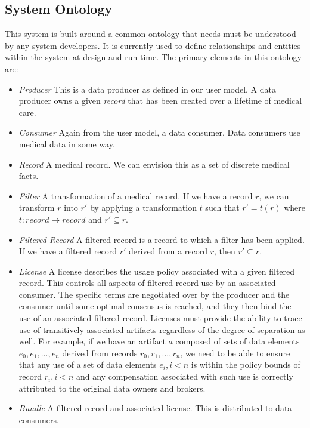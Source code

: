 \documentclass[10pt, conference, compsocconf]{IEEEtran}
\begin{document}
\subsection{System Ontology}
This system is built around a common ontology that needs must be understood by any system developers.  It is currently used to define relationships and entities within the system at design and run time.  The primary elements in this ontology are:
\begin{itemize}
\item \textit{Producer} This is a data producer as defined in our user model.  A data producer owns a given \textit{record} that has been created over a lifetime of medical care.
\item \textit{Consumer} Again from the user model, a data consumer.  Data consumers use medical data in some way.
\item \textit{Record} A medical record.  We can envision this as a set of discrete medical facts.
\item \textit{Filter} A transformation of a medical record.  If we have a record $ r $, we can transform $ r $ into $ r' $ by applying a transformation $ t $ such that $ r' = t(r) $ where $ t : record \rightarrow record $ and $ r' \subseteq r $.
\item \textit{Filtered Record} A filtered record is a record to which a filter has been applied.  If we have a filtered record $ r' $ derived from a record $ r $, then $ r' \subseteq r $.
\item \textit{License} A license describes the usage policy associated with a given filtered record.  This controls all aspects of filtered record use by an associated consumer.  The specific terms are negotiated over by the producer and the consumer until some optimal consensus is reached, and they then bind the use of an associated filtered record.  Licenses must provide the ability to trace use of transitively associated artifacts regardless of the degree of separation as well.  For example, if we have an artifact $ a $ composed of sets of data elements $ e_{0}, e_{1}, ... , e_{n} $ derived from records $ r_{0}, r_{1}, ... , r_{n} $, we need to be able to ensure that any use of a set of data elements $ e_{i}, i < n $ is within the policy bounds of record $ r_{i}, i < n $ and any compensation associated with such use is correctly attributed to the original data owners and brokers.
\item \textit{Bundle} A filtered record and associated license.  This is distributed to data consumers.
\end{itemize}
\end{document}
